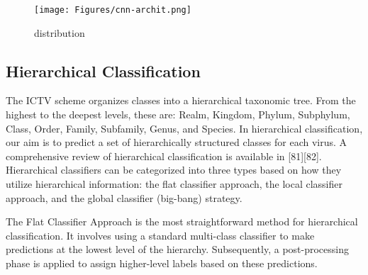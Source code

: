 \begin{figure*}[t]
\begin{centering}
		\texttt{[image: Figures/cnn-archit.png]}
	\caption{distribution  }
\label{fig:cnn-archit}
\end{centering}
\end{figure*}

\subsection{Hierarchical Classification}

The ICTV scheme organizes classes into a hierarchical taxonomic tree. From the highest to the deepest levels, these are: Realm, Kingdom, Phylum, Subphylum, Class, Order, Family, Subfamily, Genus, and Species. In hierarchical classification, our aim is to predict a set of hierarchically structured classes for each virus. A comprehensive review of hierarchical classification is available in [81][82]. Hierarchical classifiers can be categorized into three types based on how they utilize hierarchical information: the flat classifier approach, the local classifier approach, and the global classifier (big-bang) strategy.

The Flat Classifier Approach is the most straightforward method for hierarchical classification. It involves using a standard multi-class classifier to make predictions at the lowest level of the hierarchy. Subsequently, a post-processing phase is applied to assign higher-level labels based on these predictions.

